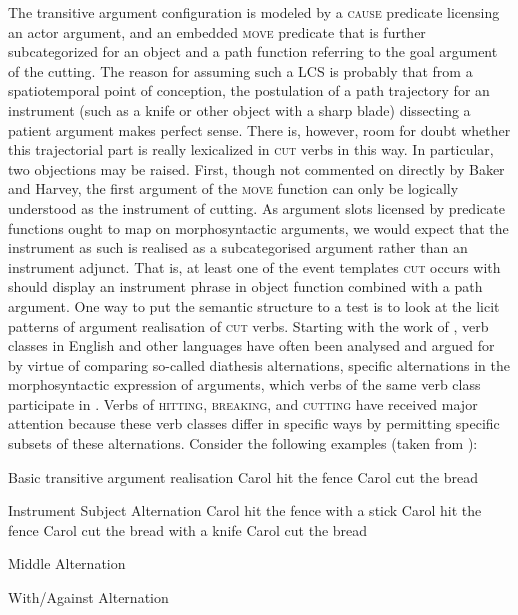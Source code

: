 The transitive argument configuration is modeled by a \textsc{cause} predicate licensing an actor argument, and an embedded \textsc{move} predicate that is further subcategorized for an object and a path function referring to the goal argument of the cutting. The reason for assuming such a LCS is probably that from a spatiotemporal point of conception, the postulation of a path trajectory for an instrument (such as a knife or other object with a sharp blade) dissecting a patient argument makes perfect sense. There is, however, room for doubt whether this trajectorial part is really lexicalized in \textsc{cut} verbs in this way. In particular, two objections may be raised. First, though not commented on directly by Baker and Harvey, the first argument of the \textsc{move} function can only be logically understood as the instrument of cutting. As argument slots licensed by predicate functions ought to map on morphosyntactic arguments, we would expect that the instrument as such is realised as a subcategorised argument rather than an instrument adjunct. That is, at least one of the event templates \textsc{cut} occurs with should display an instrument phrase in object function combined with a path argument. One way to put the semantic structure to a test is to look at the licit patterns of argument realisation of \textsc{cut} verbs. Starting with the work of \citet{Fillmore1970}, verb classes in English and other languages have often been analysed and argued for by virtue of comparing so-called diathesis alternations, specific alternations in the morphosyntactic expression of arguments, which verbs of the same verb class participate in \citep{Levin1993}. Verbs of \textsc{hitting}, \textsc{breaking}, and \textsc{cutting} have received major attention because these verb classes differ in specific ways by permitting specific subsets of these alternations. Consider the following examples (taken from \citealt[148f. and 156]{Levin1993}):

\ea Basic transitive argument realisation \label{alt01}
\ea Carol hit the fence
\ex Carol cut the bread
\z
\z

\ea Instrument Subject Alternation \label{alt02}
\ea Carol hit the fence with a stick
\ex Carol hit the fence
\ex Carol cut the bread with a knife
\ex Carol cut the bread
\z
\z

\ea Middle Alternation \label{alt03}
\z
\z

\ea With/Against Alternation \label{alt04}
\z
\z

